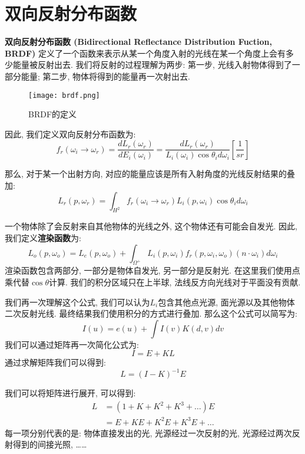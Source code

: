 \documentclass[openany]{progbookcn}
\begin{document}
\section{双向反射分布函数}
\textbf{双向反射分布函数 (Bidirectional Reflectance Distribution Fuction, BRDF) }定义了一个函数来表示从某一个角度入射的光线在某一个角度上会有多少能量被反射出去. 我们将反射的过程理解为两步: 第一步, 光线入射物体得到了一部分能量; 第二步, 物体将得到的能量再一次射出去. 

\begin{figure}[H]
	\centering
	\texttt{[image: brdf.png]}
	\caption{BRDF的定义}
	\label{fig:brdf}
\end{figure}

因此, 我们定义双向反射分布函数为: 
\begin{equation}
	f_r(\omega_i\rightarrow \omega_r)=\frac{dL_r(\omega_r)}{dE_i(\omega_i)}=\frac{dL_r(\omega_r)}{L_i(\omega_i)\cos\theta_i d\omega_i}[\frac{1}{sr}]
\end{equation}

那么, 对于某一个出射方向, 对应的能量应该是所有入射角度的光线反射结果的叠加: 
\begin{equation}
	L_r(p,\omega_r)=\int_{H^2}f_r(\omega_i\rightarrow \omega_r)L_i(p,\omega_i)\cos\theta_id\omega_i
\end{equation}

一个物体除了会反射来自其他物体的光线之外, 这个物体还有可能会自发光. 因此, 我们定义\textbf{渲染函数}为: 
\begin{equation}
	L_o(p,\omega_o)=L_e(p,\omega_o)+\int_{\Omega^+}L_i(p,\omega_i)f_r(p,\omega_i,\omega_o)(n\cdot \omega_i)d\omega_i
\end{equation}渲染函数包含两部分, 一部分是物体自发光, 另一部分是反射光. 在这里我们使用点乘代替$\cos\theta$计算. 我们的积分区域只在上半球, 法线反方向光线对于平面没有贡献. 

我们再一次理解这个公式, 我们可以认为$L_i$包含其他点光源, 面光源以及其他物体二次反射光线. 最终结果我们使用积分的方式进行叠加. 那么这个公式可以简写为: 
\begin{equation}
	I(u)=e(u)+\int I(v)K(d,v)dv
\end{equation} 我们可以通过矩阵再一次简化公式为: 
\begin{equation}
	I=E+KL
\end{equation}
通过求解矩阵我们可以得到: 
\begin{equation}
	L=(I-K)^{-1}E
\end{equation}

我们可以将矩阵进行展开, 可以得到: 
\begin{equation}
	\begin{split}
		L&=(1+K+K^2+K^3+\dots)E\\
		&=E+KE+K^2E+K^3E+\dots
	\end{split}
\end{equation}
每一项分别代表的是: 物体直接发出的光, 光源经过一次反射的光, 光源经过两次反射得到的间接光照, ……
\end{document}
